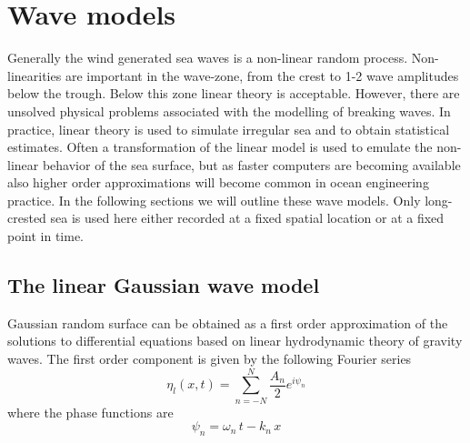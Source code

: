 \chapter{Wave models}
\label{cha:wave-models}
Generally the wind generated sea waves is a non-linear random
process. Non-linearities are important in the wave-zone, \ie{} from the
crest to 1-2 wave amplitudes below the trough. Below this zone linear
theory is acceptable.
However, there are unsolved physical problems associated with the
modelling of breaking waves. In practice, linear theory is used to
simulate irregular sea and to obtain statistical estimates.
Often a transformation of the linear model is used to emulate the
non-linear behavior of the sea surface, but  as faster computers are
becoming available also higher order
approximations will become common in ocean engineering practice.
In the following sections we will outline these wave models.
Only long-crested sea is used here either recorded
at a fixed spatial location or at a fixed point in time.

\section{The linear Gaussian wave model}
\label{sec:linear-gaussian-wave}
Gaussian random surface can be obtained as a first order approximation
of the solutions to differential equations based on linear
hydrodynamic theory of gravity waves.
The first order component is given by the following Fourier series
\begin{equation}
  \label{eq:linearcomponent}
 \eta_{l}(x,t) = \sum_{n=-N}^{N} \frac{A_{n}}{2} e^{i\psi_{n}}
\end{equation}
where the phase functions are
\begin{equation}
  \label{eq:phasefunction}
  \psi_{n} = \omega_{n}\,t-k_{n}\,x  %
\end{equation}

